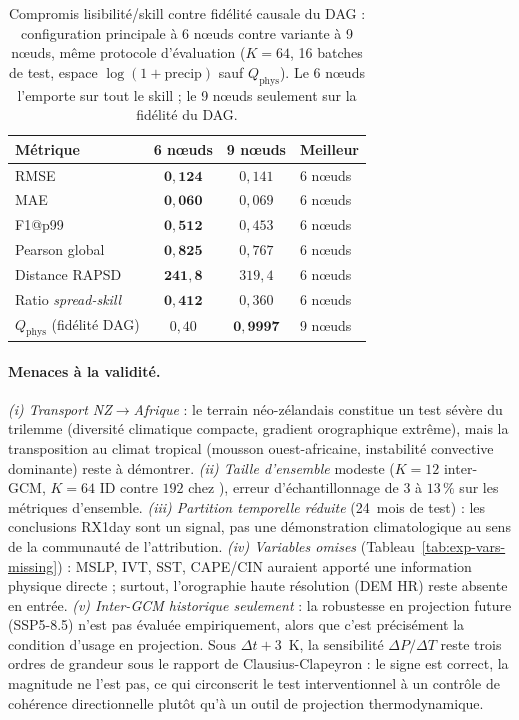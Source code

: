 \begin{table}[H]
  \centering
  \small
  \caption[Compromis skill vs fidélité causale : 6 vs 9 nœuds]{Compromis lisibilité/skill contre fidélité causale du DAG : configuration principale à 6 nœuds contre variante à 9 nœuds, même protocole d'évaluation ($K=64$, 16 batches de test, espace $\log(1+\mathrm{precip})$ sauf $Q_{\mathrm{phys}}$). Le 6 nœuds l'emporte sur tout le skill ; le 9 nœuds seulement sur la fidélité du DAG.}
  \label{tab:exp-6vs9}
  \begin{tabularx}{\linewidth}{l c c X}
    \toprule
    \textbf{Métrique} & \textbf{6 nœuds} & \textbf{9 nœuds} & \textbf{Meilleur} \\
    \midrule
    RMSE                        & $\mathbf{0{,}124}$ & $0{,}141$   & 6 nœuds \\
    MAE                         & $\mathbf{0{,}060}$ & $0{,}069$   & 6 nœuds \\
    F1@p99                      & $\mathbf{0{,}512}$ & $0{,}453$   & 6 nœuds \\
    Pearson global              & $\mathbf{0{,}825}$ & $0{,}767$   & 6 nœuds \\
    Distance RAPSD              & $\mathbf{241{,}8}$ & $319{,}4$   & 6 nœuds \\
    Ratio \emph{spread-skill}   & $\mathbf{0{,}412}$ & $0{,}360$   & 6 nœuds \\
    \midrule
    $Q_{\mathrm{phys}}$ (fidélité DAG) & $0{,}40$ & $\mathbf{0{,}9997}$ & 9 nœuds \\
    \bottomrule
  \end{tabularx}
\end{table}

\paragraph{Menaces à la validité.} \emph{(i) Transport NZ$\to$Afrique} : le terrain néo-zélandais constitue un test sévère du trilemme (diversité climatique compacte, gradient orographique extrême), mais la transposition au climat tropical (mousson ouest-africaine, instabilité convective dominante) reste à démontrer. \emph{(ii) Taille d'ensemble} modeste ($K=12$ inter-GCM, $K=64$ ID contre $192$ chez \CorrDiff{}), erreur d'échantillonnage de $3$ à $13\,\%$ sur les métriques d'ensemble. \emph{(iii) Partition temporelle réduite} (24~mois de test) : les conclusions RX1day sont un signal, pas une démonstration climatologique au sens de la communauté de l'attribution. \emph{(iv) Variables \LR{} omises} (Tableau~\ref{tab:exp-vars-missing}) : MSLP, IVT, SST, CAPE/CIN auraient apporté une information physique directe ; surtout, l'orographie haute résolution (DEM HR) reste absente en entrée. \emph{(v) Inter-GCM historique seulement} : la robustesse en projection future (SSP5-8.5) n'est pas évaluée empiriquement, alors que c'est précisément la condition d'usage en projection. Sous $\Delta t+3$~K, la sensibilité $\Delta P/\Delta T$ reste trois ordres de grandeur sous le rapport de Clausius-Clapeyron : le signe est correct, la magnitude ne l'est pas, ce qui circonscrit le test interventionnel à un contrôle de cohérence directionnelle plutôt qu'à un outil de projection thermodynamique.

